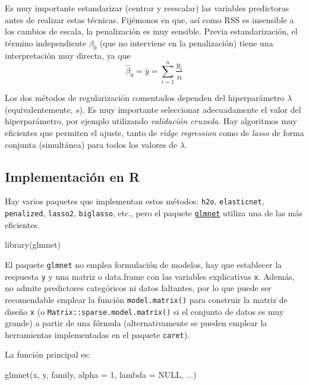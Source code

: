 \documentclass[
]{book}
\newenvironment{Shaded}{\begin{snugshade}}{\end{snugshade}}
\newcommand{\AttributeTok}[1]{\textcolor[rgb]{0.77,0.63,0.00}{#1}}
\newcommand{\ConstantTok}[1]{\textcolor[rgb]{0.00,0.00,0.00}{#1}}
\newcommand{\DecValTok}[1]{\textcolor[rgb]{0.00,0.00,0.81}{#1}}
\newcommand{\FunctionTok}[1]{\textcolor[rgb]{0.00,0.00,0.00}{#1}}
\newcommand{\NormalTok}[1]{#1}
\theoremstyle{break}
\theoremstyle{definition}
\theoremstyle{definition}
\theoremstyle{definition}
\theoremstyle{definition}
\theoremstyle{remark}
\begin{document}
Es muy importante estandarizar (centrar y reescalar) las variables predictoras antes de realizar estas técnicas.
Fijémonos en que, así como \(\mbox{RSS}\) es insensible a los cambios de escala, la penalización es muy sensible.
Previa estandarización, el término independiente \(\beta_0\) (que no interviene en la penalización) tiene una interpretación muy directa, ya que
\[\widehat \beta_0 = \bar y =\sum_{i=1}^n \frac{y_i}{n}\]

Los dos métodos de regularización comentados dependen del hiperparámetro \(\lambda\) (equivalentemente, \(s\)).
Es muy importante seleccionar adecuadamente el valor del hiperparámetro, por ejemplo utilizando \emph{validación cruzada}.
Hay algoritmos muy eficientes que permiten el ajuste, tanto de \emph{ridge regression} como de \emph{lasso} de forma conjunta (simultánea) para todos los valores de \(\lambda\).

\hypertarget{implementaciuxf3n-en-r}{%
\subsection{Implementación en R}\label{implementaciuxf3n-en-r}}

Hay varios paquetes que implementan estos métodos: \texttt{h2o}, \texttt{elasticnet}, \texttt{penalized}, \texttt{lasso2}, \texttt{biglasso}, etc., pero el paquete \href{https://glmnet.stanford.edu}{\texttt{glmnet}} utiliza una de las más eficientes.

\begin{Shaded}
\begin{Highlighting}[]
\FunctionTok{library}\NormalTok{(glmnet)}
\end{Highlighting}
\end{Shaded}

El paquete \texttt{glmnet} no emplea formulación de modelos, hay que establecer la respuesta
\texttt{y} y una matriz o data.frame con las variables explicativas \texttt{x}.
Además, no admite predictores categóricos ni datos faltantes, por lo que puede ser recomendable emplear la función \texttt{model.matrix()} para construir la matriz de diseño \texttt{x} (o \texttt{Matrix::sparse.model.matrix()} si el conjunto de datos es muy grande) a partir de una fórmula (alternativamente se pueden emplear la herramientas implementadas en el paquete \texttt{caret}).

La función principal es:

\begin{Shaded}
\begin{Highlighting}[]
\FunctionTok{glmnet}\NormalTok{(x, y, family, }\AttributeTok{alpha =} \DecValTok{1}\NormalTok{, }\AttributeTok{lambda =} \ConstantTok{NULL}\NormalTok{, ...)}
\end{Highlighting}
\end{Shaded}
\end{document}
